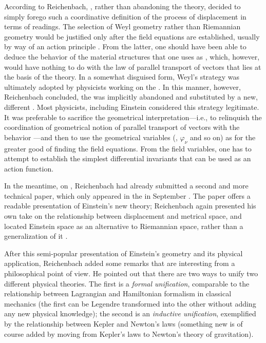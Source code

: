 \documentclass[draft]{article}
\begin{document}
According to Reichenbach, \citet{Weyl1920}, rather than abandoning the theory, decided to simply forego such a coordinative definition of the process of displacement in terms of \rach readings. The selection of Weyl geometry rather than Riemannian geometry would be justified only after the field equations are established, usually by way of an action principle \citep{Weyl1921d,Weyl1921e}. From the latter, one should have been able to deduce the behavior of the material structures that one uses as \rac, which, however, would have nothing to do with the law of parallel transport of vectors that lies at the basis of the theory. In a somewhat disguised form, Weyl's strategy was ultimately adopted by physicists working on the \uftp \citep{Eddington1921,Eddington1923}. In this manner, however, Reichenbach concluded, the  was implicitly abandoned and substituted by a new, different . Most physicists, including Einstein  considered this strategy legitimate. It was preferable to sacrifice the geometrical interpretation---i.e., to relinquish the coordination of geometrical notion of parallel transport of vectors with the behavior \rac---and then to use the geometrical variables (\Gtmn, $\varphi_\nu$ and so on) as  for the greater good of finding the field equations. From the field variables, one has to attempt to establish the simplest differential invariants that can be used as an action function.


In the meantime, on , Reichenbach had already submitted a second and more technical paper, which only appeared in the  in September \citep{Reichenbach1929a}. The paper offers a readable presentation of Einstein's new theory; Reichenbach again presented his own take on the relationship between displacement and metrical space, and located Einstein space as an alternative to Riemannian space, rather than a generalization of it \citep[684--687]{Reichenbach1929a}. 

After this semi-popular presentation of Einstein's geometry and its physical application, Reichenbach added some remarks that are interesting from a philosophical point of view. He pointed out that there are two ways to unify two different physical theories. The first is a \emph{formal unification}, comparable to the relationship between Lagrangian and Hamiltonian formalism in classical mechanics (the first can be Legendre transformed into the other without adding any new physical knowledge); the second is an \emph{inductive unification}, exemplified by the relationship between Kepler and Newton's laws (something new is of course added by moving from Kepler's laws to Newton's theory of gravitation). 
\end{document}

